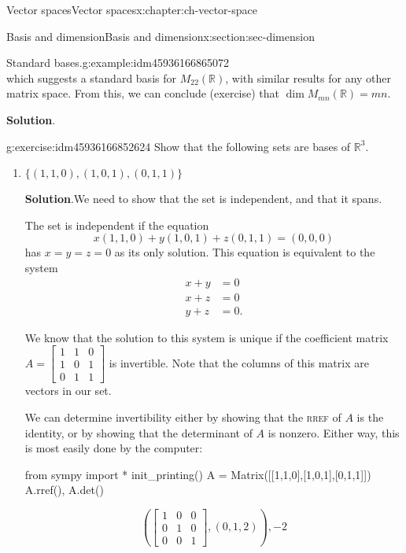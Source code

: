 \documentclass[oneside,10pt,]{book}
\newcommand{\blocktitlefont}{\relax}
\newcommand{\initialism}[1]{\textsc{\MakeLowercase{#1}}}
\numberwithin{equation}{section}
\newcommand{\bbm}{\begin{bmatrix}}
\newcommand{\ebm}{\end{bmatrix}}
\newcommand{\R}{\mathbb{R}}
\newcommand{\amp}{&}
\begin{document}
\begin{chapterptx}{Vector spaces}{}{Vector spaces}{}{}{x:chapter:ch-vector-space}
\begin{sectionptx}{Basis and dimension}{}{Basis and dimension}{}{}{x:section:sec-dimension}
\begin{example}{Standard bases.}{g:example:idm45936166865072}
\begin{equation*}
\end{equation*}
which suggests a standard basis for \(M_{22}(\R)\), with similar results for any other matrix space. From this, we can conclude (exercise) that \(\dim M_{mn}(\R)=mn\).%
\par\smallskip%
\noindent\textbf{\blocktitlefont Solution}.\label{g:solution:idm45936166853040}{}\hypertarget{g:solution:idm45936166853040}{}\quad{}%
\end{example}
\begin{inlineexercise}{}{g:exercise:idm45936166852624}%
Show that the following sets are bases of \(\R^3\).%
\begin{enumerate}[font=\bfseries,label=(\alph*),ref=\alph*]
\item{}\(\{(1,1,0),(1,0,1),(0,1,1)\}\)%
\par\smallskip%
\noindent\textbf{\blocktitlefont Solution}.\label{g:solution:idm45936166850432}{}\hypertarget{g:solution:idm45936166850432}{}\quad{}We need to show that the set is independent, and that it spans.%
\par
The set is independent if the equation%
\begin{equation*}
x(1,1,0)+y(1,0,1)+z(0,1,1)=(0,0,0)
\end{equation*}
has \(x=y=z=0\) as its only solution. This equation is equivalent to the system%
\begin{align*}
x+y \amp =0\\
x+z \amp =0\\
y+z \amp =0\text{.}
\end{align*}
%
\par
We know that the solution to this system is unique if the coefficient matrix \(A = \bbm 1\amp 1\amp 0\\1\amp 0\amp 1\\0\amp 1\amp 1\ebm\) is invertible. Note that the columns of this matrix are vectors in our set.%
\par
We can determine invertibility either by showing that the \initialism{RREF} of \(A\) is the identity, or by showing that the determinant of \(A\) is nonzero. Either way, this is most easily done by the computer:%
\begin{sageinput}
from sympy import *
init_printing()
A = Matrix([[1,1,0],[1,0,1],[0,1,1]])
A.rref(), A.det()
\end{sageinput}
\begin{sageoutput}
\[\left(\bbm 1\amp 0\amp 0\\0\amp 1\amp 0\\0\amp 0\amp 1\ebm, (0,1,2)\right), -2\]

\end{sageoutput}
\end{enumerate}
\end{inlineexercise}
\end{sectionptx}
\end{chapterptx}
\end{document}
